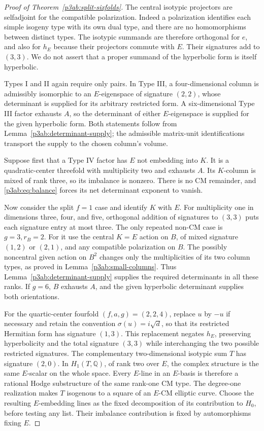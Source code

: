 \documentclass[11pt]{article}
\newcommand{\Q}{\mathbb Q}
\numberwithin{equation}{section}
\begin{document}
\begin{proof}[Proof of Theorem~\ref{p3ab:split-sixfolds}]
The central isotypic projectors are selfadjoint for the compatible
polarization.  Indeed a polarization identifies each simple
isogeny type with its own dual type, and there are no homomorphisms
between distinct types.  The isotypic summands are therefore
orthogonal for \(e\), and also for \(h_E\) because their
projectors commute with \(E\).  Their signatures add to
\((3,3)\).  We do not assert that a proper summand of the
hyperbolic form is itself hyperbolic.

Types I and II again require only pairs.  In Type III, a
four-dimensional column is admissibly isomorphic to an
\(E\)-eigenspace of signature \((2,2)\), whose determinant is
supplied for its arbitrary restricted form.  A six-dimensional
Type III factor exhausts \(A\), so the determinant of either
\(E\)-eigenspace is supplied for the given hyperbolic form.
Both statements follow from Lemma~\ref{p3ab:determinant-supply};
the admissible matrix-unit identifications transport the supply
to the chosen column's volume.

Suppose first that a Type IV factor has \(E\) not embedding
into \(K\).  It is a quadratic-center threefold with multiplicity
two and exhausts \(A\).  Its \(K\)-column is mixed of rank three,
so its imbalance is nonzero.  There is no CM remainder, and
\eqref{p3ab:eq:balance} forces its net determinant exponent to
vanish.

Now consider the split \(f=1\) case and identify \(K\) with \(E\).
For multiplicity one in dimensions three,
four, and five, orthogonal addition of signatures to \((3,3)\)
puts each signature entry at most three.  The only repeated
non-CM case is \(g=3,r_B=2\).  For it use the central \(K=E\)
action on \(B\), of mixed signature \((1,2)\) or \((2,1)\),
and any compatible polarization on \(B\).  The possibly
noncentral given action on \(B^2\) changes only the multiplicities
of its two column types, as proved in
Lemma~\ref{p3ab:small-columns}.  Thus
Lemma~\ref{p3ab:determinant-supply} supplies the required
determinants in all these ranks.  If \(g=6\), \(B\) exhausts
\(A\), and the given hyperbolic determinant supplies both
orientations.

For the quartic-center fourfold \((f,a,g)=(2,2,4)\), replace
\(u\) by \(-u\) if necessary and retain the convention
\(\sigma(u)=i\sqrt d\), so that its restricted Hermitian form has
signature \((1,3)\).  This replacement negates \(h_E\), preserving
hyperbolicity and the total signature \((3,3)\) while interchanging
the two possible restricted signatures.  The complementary two-dimensional isotypic sum
\(T\) has signature \((2,0)\).  In \(H_1(T,\Q)\), of rank
two over \(E\), the complex structure is the same \(E\)-scalar
on the whole space.  Every \(E\)-line in an \(E\)-basis is
therefore a rational Hodge substructure of the same rank-one CM
type.  The degree-one realization makes \(T\) isogenous to a
square of an \(E\)-CM elliptic curve.  Choose the resulting
\(E\)-embedding lines as the fixed decomposition of its contribution
to \(H_0\), before testing any list.
Their imbalance contribution is fixed by automorphisms fixing
\(E\).


\end{proof}
\end{document}
